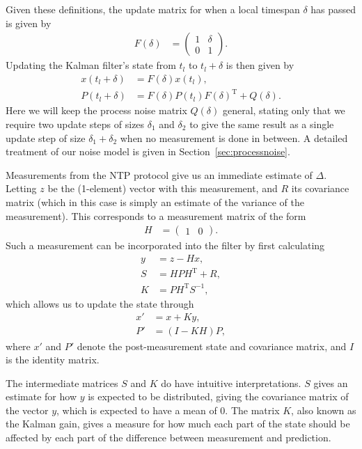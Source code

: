 \documentclass{article}
\begin{document}
Given these definitions, the update matrix for when a local timespan $\delta$ has passed is given by
\begin{align}
F(\delta) &= \begin{pmatrix}
1 & \delta\\
0 & 1
\end{pmatrix}.
\end{align}
Updating the Kalman filter's state from $t_l$ to $t_l+\delta$ is then given by
\begin{align}
x(t_l+\delta) &= F(\delta)x(t_l),\\
P(t_l+\delta) &= F(\delta)P(t_l)F(\delta)^\mathrm{T} + Q(\delta).
\end{align}
Here we will keep the process noise matrix $Q(\delta)$ general, stating only that we require two update steps of sizes $\delta_1$ and $\delta_2$
to give the same result as a single update step of size $\delta_1 + \delta_2$ when no measurement is done in between.
A detailed treatment of our noise model is given in Section~\ref{sec:processnoise}.

Measurements from the NTP protocol give us an immediate estimate of $\Delta$. Letting $z$ be the (1-element) vector with this measurement,
and $R$ its covariance matrix (which in this case is simply an estimate of the variance of the measurement).
This corresponds to a measurement matrix of the form
\begin{align}
H &= \begin{pmatrix}
1 & 0
\end{pmatrix}.
\end{align}
Such a measurement can be incorporated into the filter by first calculating
\begin{align}
y &= z - Hx,\\
S &= H P H^\mathrm{T} + R,\\
K &= P H^\mathrm{T} S^{-1},
\end{align}
which allows us to update the state through
\begin{align}
x' &= x + Ky,\\
P' &= (I - K H)P,
\end{align}
where $x'$ and $P'$ denote the post-measurement state and covariance matrix, and $I$ is the identity matrix.

The intermediate matrices $S$ and $K$ do have intuitive interpretations. $S$ gives an estimate for how $y$ is expected to be distributed, giving the covariance matrix of the vector $y$, which is expected to have a mean of $0$. The matrix $K$, also known as the Kalman gain, gives a measure for how much each part of the state should be affected by each part of the difference between measurement and prediction.
\end{document}
